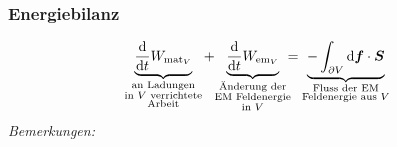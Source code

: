 \subsubsection{Energiebilanz}

\begin{equation*}
\ub{\prd{}{t} W_{\tx{mat} _V}}_{\mathclap{\substack{\tx{an Ladungen} \\ \tx{in } V \tx{ verrichtete} \\ \tx{Arbeit}}}} \ \ + \ \ \ub{\prd{}{t} W_{\tx{em}_V}}_{\mathclap{\substack{\tx{Änderung der} \\ \tx{EM Feldenergie} \\ \tx{in } V}}} \ = \ \ub{- \int_{\partial V} \dd \vec{f} \cdot \vec{S}}_{\mathclap{\substack{\tx{Fluss der EM} \\ \tx{Feldenergie aus } V}}}
\end{equation*}
%
%
%
\pagebreak
%
%
%
\noindent
\emph{Bemerkungen:}
